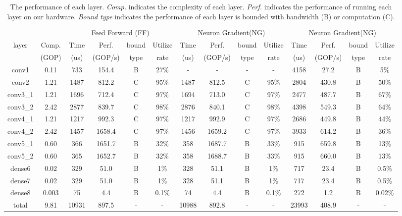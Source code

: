 \begin{table}[tb]
  \centering
  \footnotesize
  \caption{The performance of each layer. \textit{Comp.} indicates the complexity of each layer. \textit{Perf.} indicates the performance of running each layer on our hardware. \textit{Bound type} indicates the performance of each layer is bounded with bandwidth (B) or computation (C).}
\begin{tabular}{|c|c|c|c|c|c|c|c|c|c|c|c|c|c|}
\hline
      &       & \multicolumn{4}{c|}{Feed Forward (FF)}  & \multicolumn{4}{c|}{Neuron Gradient(NG)} & \multicolumn{4}{c|}{Neuron Gradient(NG)} \bigstrut\\
\cline{2-14}layer & Comp. & Time  & Perf. & bound & Utilize & Time  & Perf. & bound & Utilize & Time  & Perf. & bound & Utilize \bigstrut[t]\\
      & (GOP) & (us)  & (GOP/s) & type  & rate  & (us)  & (GOP/s) & type  & rate  & (us)  & (GOP/s) & type  & rate \bigstrut[b]\\
\hline
conv1 & 0.11  & 733   & 154.4  & B     & 27\%  & -     & -     & -     & -     & 4158  & 27.2  & B     & 5\% \bigstrut\\
\hline
conv2 & 1.21  & 1487  & 812.2  & C     & 95\%  & 1487  & 812.5  & C     & 95\%  & 2804  & 430.8  & B     & 50\% \bigstrut\\
\hline
conv3\_1 & 1.21  & 1696  & 712.4  & C     & 97\%  & 1694  & 713.0  & C     & 97\%  & 2477  & 487.7  & B     & 67\% \bigstrut\\
\hline
conv3\_2 & 2.42  & 2877  & 839.7  & C     & 98\%  & 2876  & 840.1  & C     & 98\%  & 4398  & 549.3  & B     & 64\% \bigstrut\\
\hline
conv4\_1 & 1.21  & 1217  & 992.3  & C     & 97\%  & 1217  & 992.9  & C     & 97\%  & 2686  & 449.8  & B     & 44\% \bigstrut\\
\hline
conv4\_2 & 2.42  & 1457  & 1658.4  & C     & 97\%  & 1456  & 1659.2  & C     & 97\%  & 3933  & 614.2  & B     & 36\% \bigstrut\\
\hline
conv5\_1 & 0.60  & 366   & 1651.7  & B     & 32\%  & 358   & 1687.7  & B     & 33\%  & 915   & 659.8  & B     & 13\% \bigstrut\\
\hline
conv5\_2 & 0.60  & 365   & 1652.7  & B     & 32\%  & 358   & 1688.7  & B     & 33\%  & 915   & 660.0  & B     & 13\% \bigstrut\\
\hline
dense6 & 0.02  & 329   & 51.0  & B     & 1\%   & 328   & 51.1  & B     & 1\%   & 717   & 23.4  & B     & 0.5\% \bigstrut\\
\hline
dense7 & 0.02  & 329   & 51.0  & B     & 1\%   & 328   & 51.1  & B     & 1\%   & 717   & 23.4  & B     & 0.5\% \bigstrut\\
\hline
dense8 & 0.003  & 75    & 4.4   & B     & 0.1\% & 74    & 4.4   & B     & 0.1\% & 272   & 1.2   & B     & 0.02\% \bigstrut\\
\hline
total & 9.81  & 10931  & 897.5  & -     & -     & 10988  & 892.8  & -     & -     & 23993  & 408.9  & -     & - \bigstrut\\
\hline
\end{tabular}%
  \label{tab:layerperformance}%
\end{table}%

